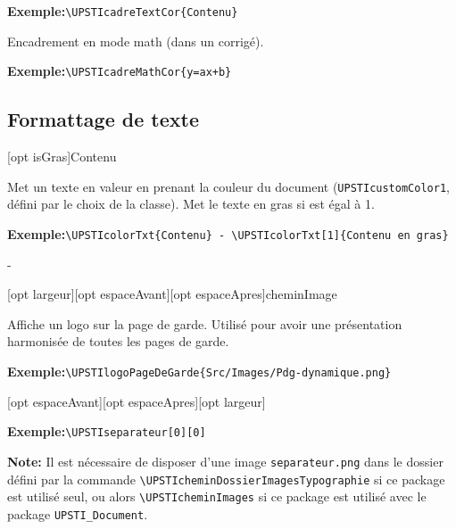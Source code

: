 \documentclass[11pt]{ltxdockit}[2010/09/26]
\newcommand{\ex}{\noindent \textbf{Exemple:}\quad}
\begin{document}
\ex\verb!\UPSTIcadreTextCor{Contenu}!

\vspace{1em}

\vspace{1em}
\begin{ltxsyntax}
\end{ltxsyntax}
Encadrement en mode math (dans un corrigé).

\ex\verb!\UPSTIcadreMathCor{y=ax+b}!

\vspace{1em}

\subsection{Formattage de texte}
\begin{ltxsyntax}
[opt isGras]{Contenu}
\end{ltxsyntax}

\noindent Met un texte en valeur en prenant la couleur du document (\texttt{UPSTIcustomColor1}, défini par le choix de la classe). Met le texte en gras si  est égal à 1.

\ex\verb!\UPSTIcolorTxt{Contenu} - \UPSTIcolorTxt[1]{Contenu en gras}!

\vspace{1em}
 - 

\vspace{1em}
\begin{ltxsyntax}
[opt largeur][opt espaceAvant][opt espaceApres]{cheminImage}
\end{ltxsyntax}

\noindent Affiche un logo sur la page de garde. Utilisé pour avoir une présentation harmonisée de toutes les pages de garde.

\ex\verb!\UPSTIlogoPageDeGarde{Src/Images/Pdg-dynamique.png}!

\vspace{1em}
\begin{ltxsyntax}
[opt espaceAvant][opt espaceApres][opt largeur]
\end{ltxsyntax}

\ex\verb!\UPSTIseparateur[0][0]!

\UPSTIseparateur[0][0]

\textbf{Note:} Il est nécessaire de disposer d'une image \texttt{separateur.png} dans le dossier défini par la commande \verb!\UPSTIcheminDossierImagesTypographie! si ce package est utilisé seul, ou alors \verb!\UPSTIcheminImages! si ce package est utilisé avec le package \texttt{UPSTI\_Document}.
\end{document}
